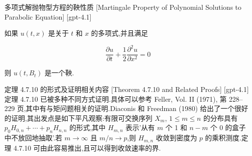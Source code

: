 \documentclass[UTF8]{ctexart}
\begin{document}
    
    
    \begin{thm}
        {多项式解抛物型方程的鞅性质}
        [Martingale Property of Polynomial Solutions to Parabolic Equation]
        [gpt-4.1]
        
如果 $u(t, x)$ 是关于 $t$ 和 $x$ 的多项式,并且满足

\[
\frac{\partial u}{\partial t} + \frac{1}{2} \frac{\partial^{2} u}{\partial x^{2}} = 0
\]

则 $u(t, B_{t})$ 是一个鞅.

    \end{thm}
    
    
    
    \begin{thm}
        {定理 4.7.10 的形式及证明相关内容}
        [Theorem 4.7.10 and Related Proofs]
        [gpt-4.1]
        定理 4.7.10 已被多种不同方式证明.具体可以参考 Feller, Vol. II (1971), 第 228–229 页,其中有与矩问题相关的证明.Diaconis 和 Freedman (1980) 给出了一个很好的证明,其出发点是如下平凡观察:有限可交换序列 $X_m$, $1 \leq m \leq n$ 的分布具有 $p_0 H_{0,n} + \cdots + p_n H_{n,n}$ 的形式,其中 $H_{m,n}$ 表示'从有 $m$ 个 1 和 $n-m$ 个 0 的盒子中不放回地抽取'.若 $m \to \infty$ 且 $m/n \to p$,则 $H_{m,n}$ 收敛到密度为 $p$ 的乘积测度.定理 4.7.10 可由此容易推出,且可以得到收敛速率的界.
    \end{thm}
    
    
    
\end{document}
